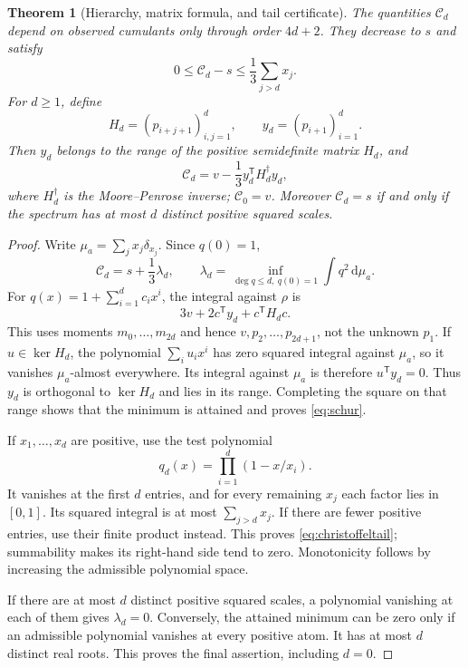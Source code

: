 \documentclass[11pt,letterpaper]{article}
\numberwithin{equation}{section}
\newtheorem{theorem}{Theorem}[section]
\theoremstyle{definition}
\theoremstyle{remark}
\newcommand{\dd}{\,\mathrm d}
\newcommand{\Cs}{\mathcal C}
\begin{document}
\begin{theorem}[Hierarchy, matrix formula, and tail certificate]
\label{thm:christoffel}
The quantities $\Cs_d$ depend on observed cumulants only through order $4d+2$.
They decrease to $s$ and satisfy
\begin{equation}
 0\le\Cs_d-s\le\frac13\sum_{j>d}x_j.
 \label{eq:christoffeltail}
\end{equation}
For $d\ge1$, define
\begin{equation}
 H_d=(p_{i+j+1})_{i,j=1}^d,\qquad y_d=(p_{i+1})_{i=1}^d.
 \label{eq:hankel}
\end{equation}
Then $y_d$ belongs to the range of the positive semidefinite matrix $H_d$, and
\begin{equation}
 \Cs_d=v-\frac13 y_d^{\mathsf T}H_d^\dagger y_d,
 \label{eq:schur}
\end{equation}
where $H_d^\dagger$ is the Moore--Penrose inverse; $\Cs_0=v$.
Moreover $\Cs_d=s$ if and only if the spectrum has at most $d$ distinct
positive squared scales.
\end{theorem}
\begin{proof}
Write $\mu_a=\sum_j x_j\delta_{x_j}$. Since $q(0)=1$,
\begin{equation}
 \Cs_d=s+\frac13\lambda_d,\qquad
 \lambda_d=\inf_{\deg q\le d,\ q(0)=1}\int q^2\dd\mu_a.
 \label{eq:lambda}
\end{equation}
For $q(x)=1+\sum_{i=1}^d c_ix^i$, the integral against $\rho$ is
\begin{equation}
 3v+2c^{\mathsf T}y_d+c^{\mathsf T}H_dc.
 \label{eq:quadratic}
\end{equation}
This uses moments $m_0,\ldots,m_{2d}$ and hence $v,p_2,\ldots,p_{2d+1}$,
not the unknown $p_1$.
If $u\in\ker H_d$, the polynomial $\sum_i u_ix^i$ has zero squared integral
against $\mu_a$, so it vanishes $\mu_a$-almost everywhere. Its integral
against $\mu_a$ is therefore $u^{\mathsf T}y_d=0$. Thus $y_d$ is orthogonal
to $\ker H_d$ and lies in its range. Completing the square on that range
shows that the minimum is attained and proves \eqref{eq:schur}.

If $x_1,\ldots,x_d$ are positive, use the test polynomial
\begin{equation}
 q_d(x)=\prod_{i=1}^d(1-x/x_i).
 \label{eq:annihilator}
\end{equation}
It vanishes at the first $d$ entries, and for every remaining $x_j$ each
factor lies in $[0,1]$. Its squared integral is at most
$\sum_{j>d}x_j$. If there are fewer positive entries, use their finite product
instead. This proves \eqref{eq:christoffeltail}; summability makes its
right-hand side tend to zero. Monotonicity follows by increasing the
admissible polynomial space.

If there are at most $d$ distinct positive squared scales, a polynomial
vanishing at each of them gives $\lambda_d=0$. Conversely, the attained
minimum can be zero only if an admissible polynomial vanishes at every
positive atom. It has at most $d$ distinct real roots. This proves the final
assertion, including $d=0$.
\end{proof}
\end{document}
